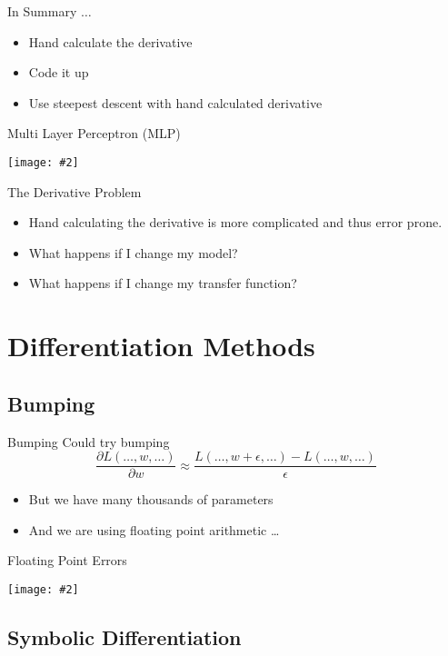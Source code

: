 \documentclass{beamer}
\newcommand {\framedgraphic}[2] {
    \begin{frame}{#1}
        \begin{center}
            \texttt{[image: \#2]}
        \end{center}
    \end{frame}
}
\begin{document}
\begin{frame}[fragile]{In Summary $\ldots$}
\begin{itemize}
\item Hand calculate the derivative
\item Code it up
\item Use steepest descent with hand calculated derivative
\end{itemize}
\end{frame}

\framedgraphic{Multi Layer Perceptron (MLP)}{diagrams/Fita2.png}

\begin{frame}[fragile]{The Derivative Problem}
\begin{itemize}
\item Hand calculating the derivative is more complicated and thus error prone.
\item What happens if I change my model?
\item What happens if I change my transfer function?
\end{itemize}
\end{frame}

\section{Differentiation Methods}

\subsection{Bumping}

\begin{frame}{Bumping}
Could try bumping
$$
\frac{\partial L(\ldots, w, \ldots)}{\partial w} \approx \frac{L(\ldots, w + \epsilon, \ldots) - L(\ldots, w, \ldots)}{\epsilon}
$$
\begin{itemize}
\item
But we have many thousands of parameters
\item
And we are using floating point arithmetic \ldots
\end{itemize}
\end{frame}

\framedgraphic{Floating Point Errors}{diagrams/13a2bd186a0e123f040da9491fa98684.png}

\subsection{Symbolic Differentiation}
\end{document}
